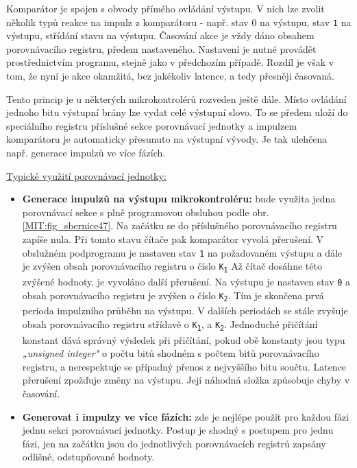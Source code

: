         Komparátor je spojen s obvody přímého ovládání výstupu. V nich lze zvolit několik typů 
        reakce na impulz z komparátoru - např. stav 0 na výstupu, stav \texttt{1} na výstupu, 
        střídání stavu na výstupu. Časování akce je vždy dáno obsahem porovnávacího registru, 
        předem nastaveného. Nastavení je nutné provádět prostřednictvím programu, stejně jako v 
        předchozím případě. Rozdíl je však v tom, že nyní je akce okamžitá, bez jakékoliv latence, 
        a tedy přesněji časovaná.
        
        Tento princip je u některých mikrokontrolérů rozveden ještě dále. Místo ovládání jednoho 
        bitu výstupní brány lze vydat celé výstupní slovo. To se předem uloží do speciálního 
        registru příslušné sekce porovnávací jednotky a impulzem komparátoru je automaticky 
        přesunuto na výstupní vývody. Je tak ulehčena např. generace impulzů ve více fázích.
        
        \underline{Typické využití porovnávací jednotky:}
        \begin{itemize}
          \item \textbf{Generace impulzů na výstupu mikrokontroléru:} bude využita jedna   
                porovnávací sekce s plně programovou obsluhou podle obr. \ref{MIT:fig_sbernice47}. 
                Na začátku se do příslušného porovnávacího registru zapíše nula. Při tomto stavu 
                čítače pak komparátor vyvolá přerušení. V obslužném podprogramu je nastaven stav 
                \texttt{1} na požadovaném výstupu a dále je zvýšen obsah porovnávacího registru o 
                číslo \texttt{K\textsubscript{1}} Až čítač dosáhne této zvýšené hodnoty, je 
                vyvoláno další přerušení. Na výstupu je nastaven stav \texttt{0} a obsah 
                porovnávacího registru je zvýšen o číslo \texttt{K\textsubscript{2}}. Tím je 
                skončena prvá perioda impulzního průběhu na výstupu. V dalších periodách se stále 
                zvyšuje obsah porovnávacího registru střídavě o \texttt{K\textsubscript{1}}, a 
                \texttt{K\textsubscript{2}}. Jednoduché přičítání konstant dává správný výsledek 
                při přičítání, pokud obě konstanty jsou typu \emph{„unsigned integer"} o počtu bitů 
                shodném s počtem bitů porovnávacího registru, a nerespektuje se případný přenos z 
                nejvyššího bitu součtu. Latence přerušení zpožďuje změny na výstupu. Její náhodná 
                složka způsobuje chyby v časování.
          \item \textbf{Generovat i impulzy ve více fázích:} zde je nejlépe použít pro každou 
                fázi jednu sekci porovnávací jednotky. Postup je shodný s postupem pro jednu fázi, 
                jen na začátku jsou  do jednotlivých porovnávacích registrů zapsány odlišné, 
                odstupňované hodnoty.
        \end{itemize}


